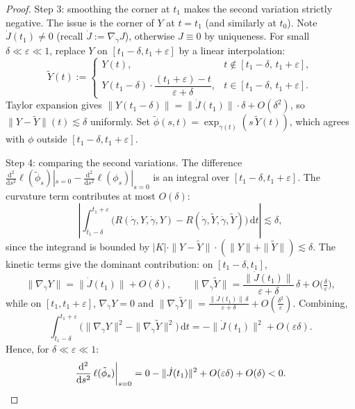 \begin{proof}
{Step 3: smoothing the corner at $t_1$ makes the second variation strictly negative.}
The issue is the corner of $Y$ at $t = t_1$ (and similarly at $t_0$). Note $\dot J(t_1) \neq 0$ (recall $\dot J := \nabla_{\dot\gamma} J$), otherwise $J \equiv 0$ by uniqueness. For small $\delta \ll \varepsilon \ll 1$, replace $Y$ on $[t_1 - \delta, t_1 + \varepsilon]$ by a linear interpolation:
\[
\tilde Y(t) := \begin{cases} Y(t), & t \notin [t_1 - \delta,\, t_1 + \varepsilon], \\ Y(t_1 - \delta) \cdot \dfrac{(t_1 + \varepsilon) - t}{\varepsilon + \delta}, & t \in [t_1 - \delta,\, t_1 + \varepsilon]. \end{cases}
\]
Taylor expansion gives $\|Y(t_1 - \delta)\| = \|\dot J(t_1)\| \cdot \delta + O(\delta^2)$, so $\|Y - \tilde Y\|(t) \lesssim \delta$ uniformly. Set $\tilde\phi(s, t) = \exp_{\gamma(t)}(s\, \tilde Y(t))$, which agrees with $\phi$ outside $[t_1 - \delta, t_1 + \varepsilon]$.

{Step 4: comparing the second variations.}
The difference $\frac{\mathrm{d}^2}{\mathrm{d}s^2}\ell(\tilde\phi_s)|_{s=0} - \frac{\mathrm{d}^2}{\mathrm{d}s^2}\ell(\phi_s)|_{s=0}$ is an integral over $[t_1 - \delta, t_1 + \varepsilon]$. The curvature term contributes at most $O(\delta)$:
\[
\left| \int_{t_1 - \delta}^{t_1 + \varepsilon} \big(R(\dot\gamma, Y, \dot\gamma, Y) - R(\dot\gamma, \tilde Y, \dot\gamma, \tilde Y)\big)\,\mathrm{d}t \right| \lesssim \delta,
\]
since the integrand is bounded by $|K| \cdot \|Y - \tilde Y\| \cdot (\|Y\| + \|\tilde Y\|) \lesssim \delta$. The kinetic terms give the dominant contribution: on $[t_1 - \delta, t_1]$,
\[
\|\nabla_{\dot\gamma} Y\| = \|\dot J(t_1)\| + O(\delta), \qquad \|\nabla_{\dot\gamma} \tilde Y\| = \frac{\|\dot J(t_1)\|}{\varepsilon + \delta}\, \delta + O\!\big(\tfrac{\delta}{\varepsilon}\big),
\]
while on $[t_1, t_1 + \varepsilon]$, $\nabla_{\dot\gamma} Y = 0$ and $\|\nabla_{\dot\gamma} \tilde Y\| = \tfrac{\|\dot J(t_1)\|\, \delta}{\varepsilon + \delta} + O(\tfrac{\delta^2}{\varepsilon})$. Combining,
\[
\int_{t_1 - \delta}^{t_1 + \varepsilon} \big(\|\nabla_{\dot\gamma} Y\|^2 - \|\nabla_{\dot\gamma} \tilde Y\|^2\big)\,\mathrm{d}t = -\|\dot J(t_1)\|^2 + O(\varepsilon \delta).
\]
Hence, for $\delta \ll \varepsilon \ll 1$:
\[
\frac{\mathrm{d}^2}{\mathrm{d}s^2}\,\ell(\tilde\phi_s)\bigg|_{s = 0} = 0 - \|\dot J(t_1)\|^2 + O(\varepsilon\delta) + O(\delta) < 0. \qedhere
\]
\end{proof}










